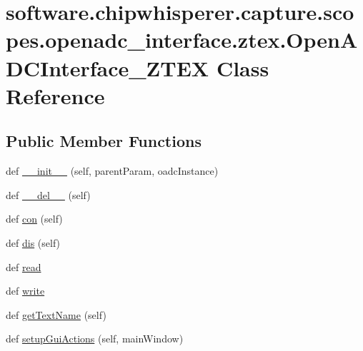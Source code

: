\hypertarget{classsoftware_1_1chipwhisperer_1_1capture_1_1scopes_1_1openadc__interface_1_1ztex_1_1OpenADCInterface__ZTEX}{}\section{software.\+chipwhisperer.\+capture.\+scopes.\+openadc\+\_\+interface.\+ztex.\+Open\+A\+D\+C\+Interface\+\_\+\+Z\+T\+E\+X Class Reference}
\label{classsoftware_1_1chipwhisperer_1_1capture_1_1scopes_1_1openadc__interface_1_1ztex_1_1OpenADCInterface__ZTEX}
\subsection*{Public Member Functions}
\begin{DoxyCompactItemize}
\item 
def \hyperlink{classsoftware_1_1chipwhisperer_1_1capture_1_1scopes_1_1openadc__interface_1_1ztex_1_1OpenADCInterface__ZTEX_a43db170081a10390abf28fded7770378}{\+\_\+\+\_\+init\+\_\+\+\_\+} (self, parent\+Param, oadc\+Instance)
\item 
def \hyperlink{classsoftware_1_1chipwhisperer_1_1capture_1_1scopes_1_1openadc__interface_1_1ztex_1_1OpenADCInterface__ZTEX_a27bb43b4228ab1fa44952e80c9d68d18}{\+\_\+\+\_\+del\+\_\+\+\_\+} (self)
\item 
def \hyperlink{classsoftware_1_1chipwhisperer_1_1capture_1_1scopes_1_1openadc__interface_1_1ztex_1_1OpenADCInterface__ZTEX_ae984f594f4d2bb31bc17fa7b18a95253}{con} (self)
\item 
def \hyperlink{classsoftware_1_1chipwhisperer_1_1capture_1_1scopes_1_1openadc__interface_1_1ztex_1_1OpenADCInterface__ZTEX_abac6fcd17bc80027ea406ec652005e3b}{dis} (self)
\item 
def \hyperlink{classsoftware_1_1chipwhisperer_1_1capture_1_1scopes_1_1openadc__interface_1_1ztex_1_1OpenADCInterface__ZTEX_a7aca6d3874f7e7922f058059f7535485}{read}
\item 
def \hyperlink{classsoftware_1_1chipwhisperer_1_1capture_1_1scopes_1_1openadc__interface_1_1ztex_1_1OpenADCInterface__ZTEX_a376eaa7c48a3194ecd088e544f720cc4}{write}
\item 
def \hyperlink{classsoftware_1_1chipwhisperer_1_1capture_1_1scopes_1_1openadc__interface_1_1ztex_1_1OpenADCInterface__ZTEX_a595205e8df6f416b533d9285d676fc3c}{get\+Text\+Name} (self)
\item 
def \hyperlink{classsoftware_1_1chipwhisperer_1_1capture_1_1scopes_1_1openadc__interface_1_1ztex_1_1OpenADCInterface__ZTEX_a2c8a4696563b33c8f540afe1a10083e3}{setup\+Gui\+Actions} (self, main\+Window)
\end{DoxyCompactItemize}
